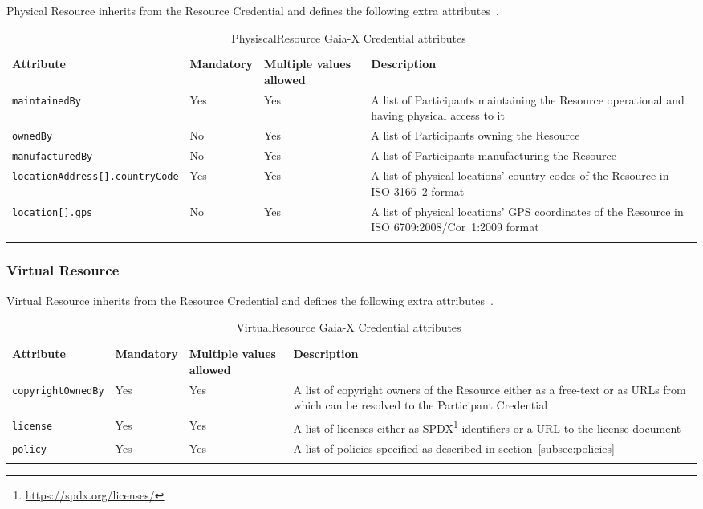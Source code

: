 Physical Resource inherits from the Resource Credential and defines the following extra attributes~\cite{gaiax_trust_framework}.

\begin{longtable}{ |p{4cm}|p{2cm}|p{2cm}|p{7cm}| }
    \hhline{----}
    \textbf{Attribute} & \textbf{Mandatory} & \textbf{Multiple values allowed} & \textbf{Description}\\
    \hhline{----}
    \texttt{maintainedBy} & Yes & Yes & A list of Participants maintaining the Resource operational and having physical access to it\\
    \hhline{----}
    \texttt{ownedBy} & No & Yes & A list of Participants owning the Resource\\
    \hhline{----}
    \texttt{manufacturedBy} & No & Yes & A list of Participants manufacturing the Resource\\
    \hhline{----}
    \texttt{locationAddress[].countryCode} & Yes & Yes & A list of physical locations' country codes of the Resource in ISO 3166--2 format\\
    \hhline{----}
    \texttt{location[].gps} & No & Yes & A list of physical locations' GPS coordinates of the Resource in ISO 6709:2008/Cor~1:2009 format\\
    \hhline{----}
    \caption{PhysiscalResource Gaia-X Credential attributes~\cite{gaiax_trust_framework}}
    \label{tab:physical_resource}
\end{longtable}

\subsubsection{Virtual Resource}

Virtual Resource inherits from the Resource Credential and defines the following extra attributes~\cite{gaiax_trust_framework}.

\begin{longtable}{ |p{4cm}|p{2cm}|p{2cm}|p{7cm}| }
    \hhline{----}
    \textbf{Attribute} & \textbf{Mandatory} & \textbf{Multiple values allowed} & \textbf{Description}\\
    \hhline{----}
    \texttt{copyrightOwnedBy} & Yes & Yes & A list of copyright owners of the Resource either as a free-text or as URLs from which can be resolved to the Participant Credential\\
    \hhline{----}
    \texttt{license} & Yes & Yes & A list of licenses either as SPDX\footnote{\url{https://spdx.org/licenses/}} identifiers or a URL to the license document\\
    \hhline{----}
    \texttt{policy} & Yes & Yes & A list of policies specified as described in section~\ref{subsec:policies}\\
    \hhline{----}
    \caption{VirtualResource Gaia-X Credential attributes~\cite{gaiax_trust_framework}}
    \label{tab:virtual_resource}
\end{longtable}

